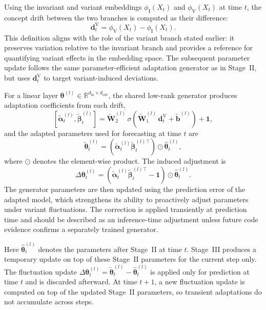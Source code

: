 ﻿\documentclass[journal]{IEEEtran}
\DeclareRobustCommand{\oldtext}[1]{{\color{revisionred}#1}}
\DeclareRobustCommand{\newtext}[1]{{\color{revisionblue}#1}}
\DeclareRobustCommand{\why}[1]{{\color{revisionblue}{\footnotesize (#1)}}}
\DeclareRobustCommand{\rw}[3]{\oldtext{#1} \newtext{#2}\why{#3}}
\begin{document}
Using the invariant and variant embeddings $\phi_{\mathrm{I}}(X_t)$ and $\phi_{\mathrm{V}}(X_t)$ at time $t$, the concept drift between the two branches is computed as their difference:
\begin{equation}
\mathbf{d}^{\mathrm{V}}_t=\phi_{\mathrm{V}}(X_t)-\phi_{\mathrm{I}}(X_t).
\end{equation}
This definition aligns with the role of the variant branch stated earlier: it preserves variation relative to the invariant branch and provides a reference for quantifying variant effects in the embedding space. The subsequent parameter update follows the same parameter-efficient adaptation generator as in Stage~II, but uses $\mathbf{d}^{\mathrm{V}}_t$ to target variant-induced deviations.

For a linear layer $\boldsymbol{\theta}^{(l)}\in\mathbb{R}^{d_{\mathrm{in}}\times d_{\mathrm{out}}}$, the shared low-rank generator produces adaptation coefficients from each drift,
\begin{equation}
\left[\tilde{\boldsymbol{\alpha}}^{(l)}_t,\tilde{\boldsymbol{\beta}}^{(l)}_t\right]
=\tilde{\mathbf{W}}^{(l)}_2\,\sigma\!\left(\tilde{\mathbf{W}}^{(l)}_1\,\mathbf{d}^{\mathrm{V}}_t+\tilde{\mathbf{b}}^{(l)}\right)+\mathbf{1},
\end{equation}
and the adapted parameters used for forecasting at time $t$ are
\begin{equation}
\tilde{{\boldsymbol{\theta}}}^{(l)}_t=\left(\tilde{\boldsymbol{\alpha}}^{(l)}_t\tilde{\boldsymbol{\beta}}^{(l)\top}_t\right)\odot \widehat{\boldsymbol{\theta}}^{(l)}_t,
\end{equation}
where $\odot$ denotes the element-wise product. The induced adjustment is
\begin{equation}
\Delta\boldsymbol{\theta}^{(l)}_t=\left(\tilde{\boldsymbol{\alpha}}^{(l)}_t\tilde{\boldsymbol{\beta}}^{(l)\top}_t-\mathbf{1}\right)\odot \widehat{\boldsymbol{\theta}}^{(l)}_t.
\end{equation}
\rw{The generator parameters are then updated using the prediction error of the adapted model, which strengthens its ability to proactively adjust parameters under variant fluctuations.}{The correction is applied transiently at prediction time and should be described as an inference-time adjustment unless future code evidence confirms a separately trained generator.}{修正方法描述与实现证据不一致的问题。} 

Here $\widehat{\boldsymbol{\theta}}^{(l)}_t$ denotes the parameters after Stage~II at time $t$. Stage~III produces a temporary update on top of these Stage~II parameters for the current step only. The fluctuation update $\Delta\boldsymbol{\theta}^{(l)}_t=\tilde{\boldsymbol{\theta}}^{(l)}_t-\widehat{\boldsymbol{\theta}}^{(l)}_t$ is applied only for prediction at time $t$ and is discarded afterward. At time $t+1$, a new fluctuation update is computed on top of the updated Stage~II parameters, so transient adaptations do not accumulate across steps.
\end{document}
